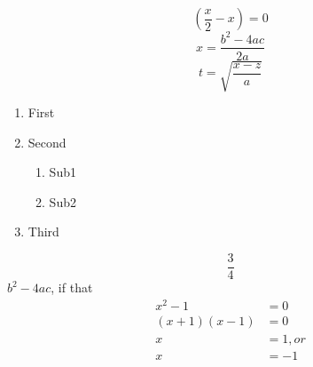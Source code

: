 \documentclass[12pt]{article}
\begin{document}
$$\left(\frac{x}{2}-x\right)=0$$
$$x=\frac{b^2-4ac}{2a}$$
$$t=\sqrt{\frac{x-z}{a}}$$
\begin{enumerate}
\item First
\item Second
	\begin{enumerate}
	\item Sub1
	\item Sub2
	\end{enumerate}
\item Third
\end{enumerate}
$$\frac{3}{4}$$
$b^2-4ac$, if that
\begin{align*}
x^2-1&=0\\
(x+1)(x-1)&=0\\
x&=1, or \\
x&=-1
\end{align*}
\end{document}
